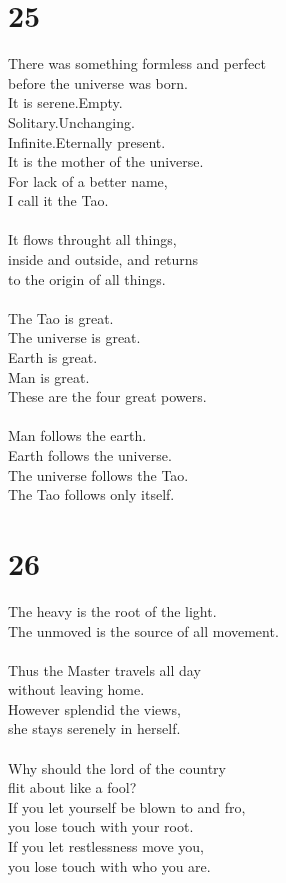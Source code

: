 \documentclass[b5paper, 12pt, oneside]{book}
\begin{document}
\chapter*{25}
There was something formless and perfect\\
before the universe was born.\\
It is serene.Empty.\\
Solitary.Unchanging.\\
Infinite.Eternally present.\\
It is the mother of the universe.\\
For lack of a better name,\\
I call it the Tao.\\
\\
It flows throught all things,\\
inside and outside, and returns\\
to the origin of all things.\\
\\
The Tao is great.\\
The universe is great.\\
Earth is great.\\
Man is great.\\
These are the four great powers.\\
\\
Man follows the earth.\\
Earth follows the universe.\\
The universe follows the Tao.\\
The Tao follows only itself.\\

\chapter*{26}
The heavy is the root of the light.\\
The unmoved is the source of all movement.\\
\\
Thus the Master travels all day\\
without leaving home.\\
However splendid the views,\\
she stays serenely in herself.\\
\\
Why should the lord of the country\\
flit about like a fool?\\
If you let yourself be blown to and fro,\\
you lose touch with your root.\\
If you let restlessness move you,\\
you lose touch with who you are.\\
\end{document}
